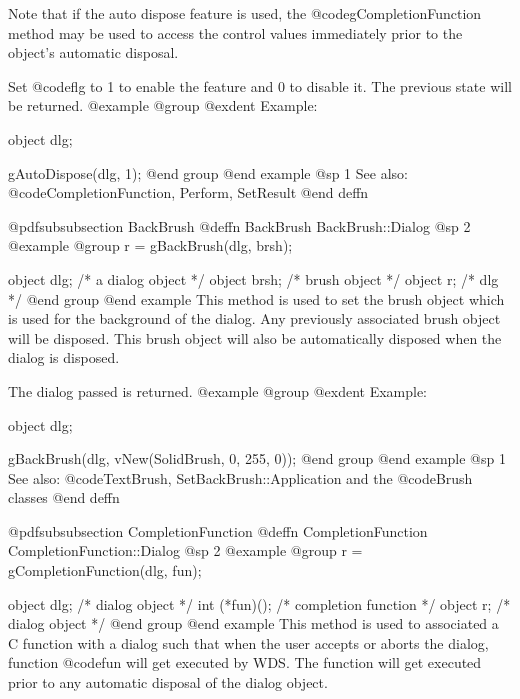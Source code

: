 Note that if the auto dispose feature is used, the @code{gCompletionFunction}
method may be used to access the control values immediately prior to
the object's automatic disposal.

Set @code{flg} to 1 to enable the feature and 0 to disable it.  The
previous state will be returned.
@example
@group
@exdent Example:

object  dlg;

gAutoDispose(dlg, 1);
@end group
@end example
@sp 1
See also:  @code{CompletionFunction, Perform, SetResult}
@end deffn














@pdfsubsubsection {BackBrush}
@deffn {BackBrush} BackBrush::Dialog
@sp 2
@example
@group
r = gBackBrush(dlg, brsh);

object  dlg;    /*  a dialog object   */
object  brsh;   /*  brush object      */
object  r;      /*  dlg               */
@end group
@end example
This method is used to set the brush object which is used for the
background of the dialog.  Any previously associated brush object will
be disposed.  This brush object will also be automatically disposed when
the dialog is disposed.

The dialog passed is returned.
@example
@group
@exdent Example:

object  dlg;

gBackBrush(dlg, vNew(SolidBrush, 0, 255, 0));
@end group
@end example
@sp 1
See also:  @code{TextBrush, SetBackBrush::Application}
        and the @code{Brush} classes
@end deffn










@pdfsubsubsection {CompletionFunction}
@deffn {CompletionFunction} CompletionFunction::Dialog
@sp 2
@example
@group
r = gCompletionFunction(dlg, fun);

object  dlg;       /*  dialog object        */
int     (*fun)();  /*  completion function  */
object  r;         /*  dialog object        */
@end group
@end example
This method is used to associated a C function with a dialog such that
when the user accepts or aborts the dialog, function @code{fun} will
get executed by WDS.  The function will get executed prior to any automatic
disposal of the dialog object.


